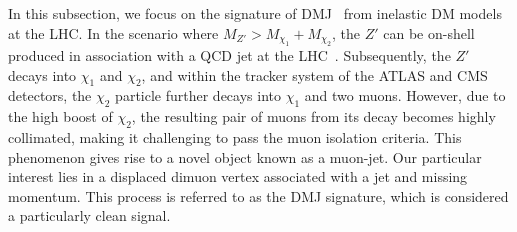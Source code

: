 \documentclass[preprint, superscriptaddress,amsmath, nofootinbib]{revtex4-1}
\begin{document}
In this subsection, we focus on the signature of DMJ~\cite{Baumgart:2009tn,Cheung:2009su,Falkowski:2010cm,Izaguirre:2015pga,Kim:2016fdv,Dube:2017jgo,Zhang:2021orr} from inelastic DM models at the LHC. In the scenario where $M_{Z'} > M_{\chi_1} + M_{\chi_2}$, the $Z'$ can be on-shell produced in association with a QCD jet at the LHC~\cite{CMS:2023bay}. Subsequently, the $Z'$ decays into $\chi_1$ and $\chi_2$, and within the tracker system of the ATLAS and CMS detectors, the $\chi_2$ particle further decays into $\chi_1$ and two muons. However, due to the high boost of $\chi_2$, the resulting pair of muons from its decay becomes highly collimated, making it challenging to pass the muon isolation criteria. This phenomenon gives rise to a novel object known as a muon-jet. Our particular interest lies in a displaced dimuon vertex associated with a jet and missing momentum. This process is referred to as the DMJ signature, which is considered a particularly clean signal. 
\end{document}
